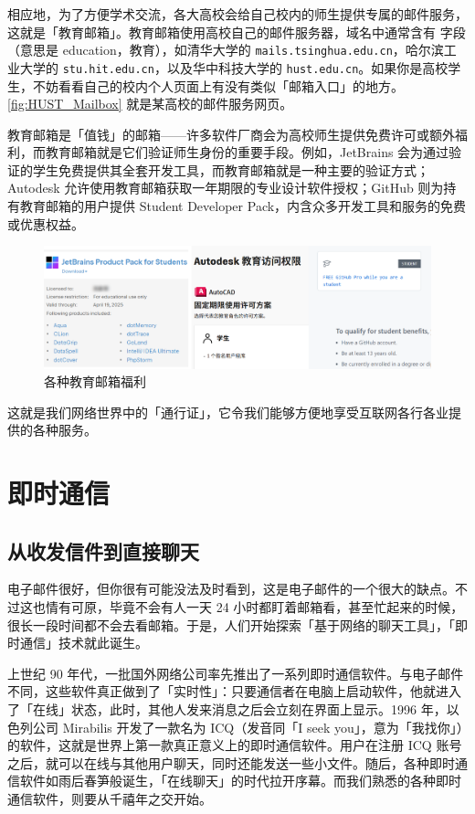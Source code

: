 相应地，为了方便学术交流，各大高校会给自己校内的师生提供专属的邮件服务，这就是「教育邮箱」。教育邮箱使用高校自己的邮件服务器，域名中通常含有  字段（意思是 education，教育），如清华大学的 \texttt{mails.tsinghua.edu.cn}，哈尔滨工业大学的 \texttt{stu.hit.edu.cn}，以及华中科技大学的 \texttt{hust.edu.cn}。如果你是高校学生，不妨看看自己的校内个人页面上有没有类似「邮箱入口」的地方。\autoref{fig:HUST_Mailbox} 就是某高校的邮件服务网页。

教育邮箱是「值钱」的邮箱——许多软件厂商会为高校师生提供免费许可或额外福利，而教育邮箱就是它们验证师生身份的重要手段。例如，JetBrains 会为通过验证的学生免费提供其全套开发工具，而教育邮箱就是一种主要的验证方式；Autodesk 允许使用教育邮箱获取一年期限的专业设计软件授权；GitHub 则为持有教育邮箱的用户提供 Student Developer Pack，内含众多开发工具和服务的免费或优惠权益。

\begin{figure}[htb!]
  \centering
  \includegraphics[width=.8\textwidth]{assets/software/Edu_Mail_Benefits.png}
  \caption{各种教育邮箱福利}
  \label{fig:Edu_Mail_Benefits}
\end{figure}

这就是我们网络世界中的「通行证」，它令我们能够方便地享受互联网各行各业提供的各种服务。

\section{即时通信}

\subsection{从收发信件到直接聊天}

电子邮件很好，但你很有可能没法及时看到，这是电子邮件的一个很大的缺点。不过这也情有可原，毕竟不会有人一天 24 小时都盯着邮箱看，甚至忙起来的时候，很长一段时间都不会去看邮箱。于是，人们开始探索「基于网络的聊天工具」，「即时通信」技术就此诞生。

上世纪 90 年代，一批国外网络公司率先推出了一系列即时通信软件。与电子邮件不同，这些软件真正做到了「实时性」：只要通信者在电脑上启动软件，他就进入了「在线」状态，此时，其他人发来消息之后会立刻在界面上显示。1996 年，以色列公司 Mirabilis 开发了一款名为 ICQ（发音同「I seek you」，意为「我找你」）的软件，这就是世界上第一款真正意义上的即时通信软件。用户在注册 ICQ 账号之后，就可以在线与其他用户聊天，同时还能发送一些小文件。随后，各种即时通信软件如雨后春笋般诞生，「在线聊天」的时代拉开序幕。而我们熟悉的各种即时通信软件，则要从千禧年之交开始。

